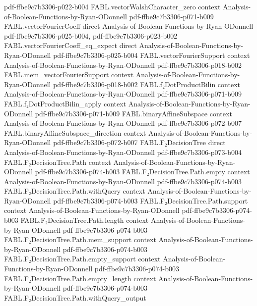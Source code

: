 \begin{theorem}
  {pdf-ffbe9c7b3306-p022-b004}
\proofstep
  {FABL.vectorWalshCharacter_zero}
  {context}
  {Analysis-of-Boolean-Functions-by-Ryan-ODonnell}
  {pdf-ffbe9c7b3306-p071-b009}
\proofstep
  {FABL.vectorFourierCoeff}
  {direct}
  {Analysis-of-Boolean-Functions-by-Ryan-ODonnell}
  {pdf-ffbe9c7b3306-p025-b004,
    pdf-ffbe9c7b3306-p023-b002}
\proofstep
  {FABL.vectorFourierCoeff_eq_expect}
  {direct}
  {Analysis-of-Boolean-Functions-by-Ryan-ODonnell}
  {pdf-ffbe9c7b3306-p025-b004}
\proofstep
  {FABL.vectorFourierSupport}
  {context}
  {Analysis-of-Boolean-Functions-by-Ryan-ODonnell}
  {pdf-ffbe9c7b3306-p018-b002}
\proofstep
  {FABL.mem_vectorFourierSupport}
  {context}
  {Analysis-of-Boolean-Functions-by-Ryan-ODonnell}
  {pdf-ffbe9c7b3306-p018-b002}
\proofstep
  {FABL.f₂DotProductBilin}
  {context}
  {Analysis-of-Boolean-Functions-by-Ryan-ODonnell}
  {pdf-ffbe9c7b3306-p071-b009}
\proofstep
  {FABL.f₂DotProductBilin_apply}
  {context}
  {Analysis-of-Boolean-Functions-by-Ryan-ODonnell}
  {pdf-ffbe9c7b3306-p071-b009}
\proofstep
  {FABL.binaryAffineSubspace}
  {context}
  {Analysis-of-Boolean-Functions-by-Ryan-ODonnell}
  {pdf-ffbe9c7b3306-p072-b007}
\proofstep
  {FABL.binaryAffineSubspace_direction}
  {context}
  {Analysis-of-Boolean-Functions-by-Ryan-ODonnell}
  {pdf-ffbe9c7b3306-p072-b007}
\proofstep
  {FABL.F₂DecisionTree}
  {direct}
  {Analysis-of-Boolean-Functions-by-Ryan-ODonnell}
  {pdf-ffbe9c7b3306-p073-b004}
\proofstep
  {FABL.F₂DecisionTree.Path}
  {context}
  {Analysis-of-Boolean-Functions-by-Ryan-ODonnell}
  {pdf-ffbe9c7b3306-p074-b003}
\proofstep
  {FABL.F₂DecisionTree.Path.empty}
  {context}
  {Analysis-of-Boolean-Functions-by-Ryan-ODonnell}
  {pdf-ffbe9c7b3306-p074-b003}
\proofstep
  {FABL.F₂DecisionTree.Path.withQuery}
  {context}
  {Analysis-of-Boolean-Functions-by-Ryan-ODonnell}
  {pdf-ffbe9c7b3306-p074-b003}
\proofstep
  {FABL.F₂DecisionTree.Path.support}
  {context}
  {Analysis-of-Boolean-Functions-by-Ryan-ODonnell}
  {pdf-ffbe9c7b3306-p074-b003}
\proofstep
  {FABL.F₂DecisionTree.Path.length}
  {context}
  {Analysis-of-Boolean-Functions-by-Ryan-ODonnell}
  {pdf-ffbe9c7b3306-p074-b003}
\proofstep
  {FABL.F₂DecisionTree.Path.mem_support}
  {context}
  {Analysis-of-Boolean-Functions-by-Ryan-ODonnell}
  {pdf-ffbe9c7b3306-p074-b003}
\proofstep
  {FABL.F₂DecisionTree.Path.empty_support}
  {context}
  {Analysis-of-Boolean-Functions-by-Ryan-ODonnell}
  {pdf-ffbe9c7b3306-p074-b003}
\proofstep
  {FABL.F₂DecisionTree.Path.empty_length}
  {context}
  {Analysis-of-Boolean-Functions-by-Ryan-ODonnell}
  {pdf-ffbe9c7b3306-p074-b003}
\proofstep
  {FABL.F₂DecisionTree.Path.withQuery_output}

\end{theorem}
